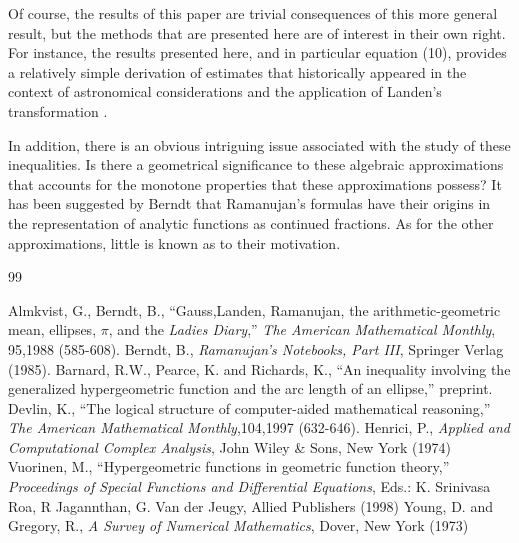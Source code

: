 \documentclass[12pt]{article}
\begin{document}
Of course, the results of this
paper are trivial consequences of this more general result,  but the 
methods that are presented
here  are of interest in their own right.  For instance,  the results presented here, and in particular
equation (10),  provides a relatively simple derivation of estimates that historically appeared in the context
of  astronomical considerations  and the application of Landen's transformation
 \cite{AB}. 




In addition, there is an obvious intriguing issue associated with  the study of these 
inequalities.
Is there a geometrical significance to these algebraic approximations that
accounts for the monotone properties that these approximations possess?  
It has been suggested by
Berndt \cite{B} that Ramanujan's formulas have their origins  in the 
representation of analytic
functions as continued fractions.  As for the other approximations, 
little is known as to
their motivation.  


\begin{thebibliography}{99}

  Almkvist, G., Berndt, B., ``Gauss,Landen, Ramanujan, the
arithmetic-geometric mean, ellipses, $\pi$, and the {\em Ladies Diary},'' 
 {\em The
American Mathematical Monthly}, 95,1988 (585-608).
 Berndt, B., {\em Ramanujan's Notebooks, Part III}, Springer Verlag 
(1985). 
  Barnard, R.W., Pearce, K. and Richards, K., ``An inequality 
involving
the generalized hypergeometric function and the arc length of an 
ellipse,'' 
preprint. 
  Devlin, K., ``The logical structure of computer-aided 
mathematical
reasoning,''  {\em The American Mathematical Monthly},104,1997 (632-646). 
  Henrici, P., {\em Applied and Computational Complex Analysis}, 
John Wiley \&
Sons,  New York (1974)
  Vuorinen, M., ``Hypergeometric functions in geometric  
function
theory,''  {\em Proceedings of Special Functions and Differential 
Equations}, Eds.: K.
Srinivasa Roa, R Jagannthan, G. Van der Jeugy, Allied Publishers (1998)
  Young, D. and Gregory, R., {\em A Survey of Numerical 
Mathematics}, Dover, 
New York (1973)


\end{thebibliography}
\end{document}
